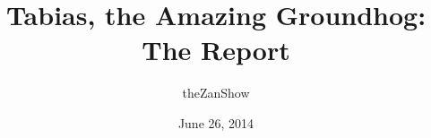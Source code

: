 \documentclass{article}
\begin{document}
\title{Tabias, the Amazing Groundhog: The Report}
\author{theZanShow}
\date{June 26, 2014}
\maketitle
\end{document}
